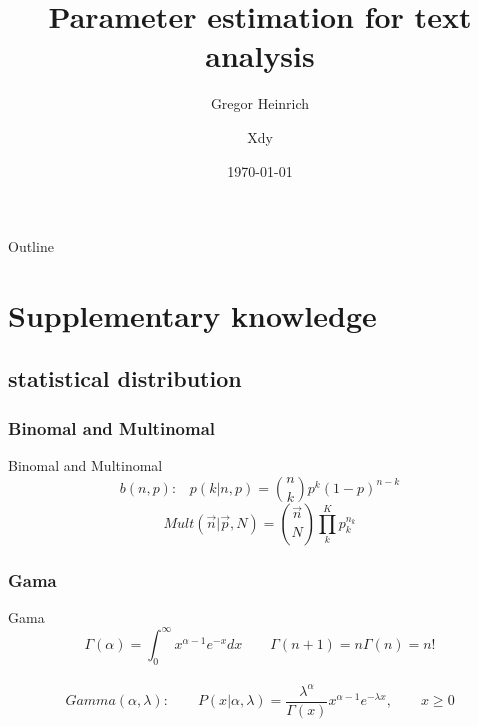 \documentclass{beamer}
\author{Xdy}
\title{Parameter estimation for text analysis}
\subtitle{Gregor Heinrich}
\institute{DONGBEI University \\  Of finance and economics}
\date{\today}
\begin{document}
\begin{CJK*}{UTF8}{gbsn}
\begin{frame}
  \titlepage
\end{frame}

\begin{frame}{Outline}
	\tableofcontents
\end{frame}




\section{Supplementary knowledge}
\subsection{statistical distribution}
\subsubsection{Binomal and Multinomal}
\begin{frame}{Binomal and Multinomal}
 $$b(n,p)\text{:} \quad p(k\vert n,p)=\binom{n}{k}p^k(1-p)^{n-k}$$
\[Mult(\overrightarrow{n}|\overrightarrow{p},N)=\binom{\overrightarrow{n}}{N}\prod_k^Kp_k^{n_k}
\]
\end{frame}


\subsubsection{Gama}
\begin{frame}{Gama}
 $$
\Gamma(\alpha)=\int_0^\infty x^{\alpha-1}e^{-x}dx\qquad \Gamma(n+1)=n\Gamma(n)=n!
$$\\

$$
Gamma(\alpha,\lambda):\qquad P(x|\alpha,\lambda)=\frac{\lambda^\alpha}{\Gamma(x)}x^{\alpha-1}e^{-\lambda x},\qquad x\geqslant 0
$$
\end{frame}


\end{CJK*}
\end{document}

